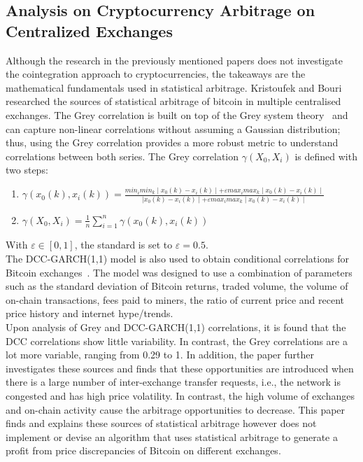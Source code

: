 \subsection{Analysis on Cryptocurrency Arbitrage on Centralized Exchanges}
Although the research in the previously mentioned papers does not investigate the cointegration approach to cryptocurrencies, the takeaways are the mathematical fundamentals used in statistical arbitrage. Kristoufek and Bouri researched the sources of statistical arbitrage of bitcoin in multiple centralised exchanges. The Grey correlation is built on top of the Grey system theory~\cite{JULONG1982288} and can capture non-linear correlations without assuming a Gaussian distribution; thus, using the Grey correlation provides a more robust metric to understand correlations between both series. The Grey correlation $\gamma(X_0, X_i)$ is defined with two steps:
\begin{enumerate}
    \item $\gamma(x_0(k), x_i(k)) = \frac{min_i min_k \mid x_0(k) - x_i(k) \mid + \varepsilon max_i max_k \mid x_0(k) - x_i(k) \mid}{\mid x_0(k) - x_i(k) \mid + \varepsilon max_i max_k \mid x_0(k) - x_i(k) \mid}$
    \item $\gamma(X_0, X_i) = \frac{1}{n} \sum_{i=1}^{n} \gamma(x_0(k), x_i(k))$
\end{enumerate}
\noindent With $\varepsilon \in [0,1]$, the standard is set to $\varepsilon = 0.5$.
\\[3mm]
The DCC-GARCH(1,1) model is also used to obtain conditional correlations for Bitcoin exchanges~\cite{engle2002dynamic}. The model was designed to use a combination of parameters such as the standard deviation of Bitcoin returns, traded volume, the volume of on-chain transactions, fees paid to miners, the ratio of current price and recent price history and internet hype/trends.
\\[3mm]
Upon analysis of Grey and DCC-GARCH(1,1) correlations, it is found that the DCC correlations show little variability. In contrast, the Grey correlations are a lot more variable, ranging from 0.29 to 1. In addition, the paper further investigates these sources and finds that these opportunities are introduced when there is a large number of inter-exchange transfer requests, i.e., the network is congested and has high price volatility. In contrast, the high volume of exchanges and on-chain activity cause the arbitrage opportunities to decrease. This paper finds and explains these sources of statistical arbitrage however does not implement or devise an algorithm that uses statistical arbitrage to generate a profit from price discrepancies of Bitcoin on different exchanges.
